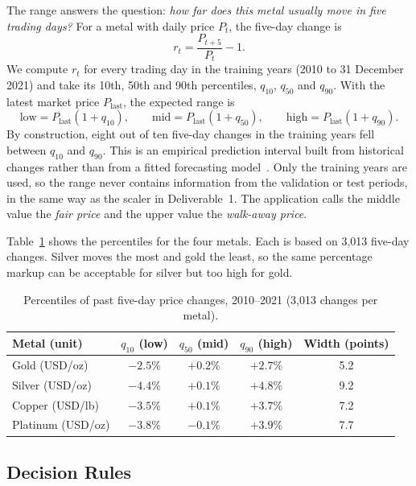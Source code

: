The range answers the question: \emph{how far does this metal usually move in
five trading days?} For a metal with daily price $P_t$, the five-day change is
\[
  r_t = \frac{P_{t+5}}{P_t} - 1 .
\]
We compute $r_t$ for every trading day in the training years (2010 to 31
December 2021) and take its 10th, 50th and 90th percentiles,
$q_{10}$, $q_{50}$ and $q_{90}$. With the latest market price $P_{\text{last}}$,
the expected range is
\[
  \text{low} = P_{\text{last}}(1+q_{10}), \qquad
  \text{mid} = P_{\text{last}}(1+q_{50}), \qquad
  \text{high} = P_{\text{last}}(1+q_{90}).
\]
By construction, eight out of ten five-day changes in the training years fell between $q_{10}$ and $q_{90}$. This is
an empirical prediction interval built from historical changes rather than
from a fitted forecasting model~\cite{a_hyndman2021}. Only the training years
are used, so the range never contains information from the validation or test
periods, in the same way as the scaler in Deliverable~1. The application calls
the middle value the \emph{fair price} and the upper value the
\emph{walk-away price}.

Table~\ref{tab:price-ranges} shows the percentiles for the four metals. Each
is based on 3,013 five-day changes. Silver moves the most and gold the least,
so the same percentage markup can be acceptable for silver but too high for
gold.

\begin{table}[H]
  \centering
  \begin{tabular}{lcccc}
    \toprule
    Metal (unit) & $q_{10}$ (low) & $q_{50}$ (mid) & $q_{90}$ (high) & Width (points) \\
    \midrule
    Gold (USD/oz)     & $-2.5\%$ & $+0.2\%$ & $+2.7\%$ & 5.2 \\
    Silver (USD/oz)   & $-4.4\%$ & $+0.1\%$ & $+4.8\%$ & 9.2 \\
    Copper (USD/lb)   & $-3.5\%$ & $+0.1\%$ & $+3.7\%$ & 7.2 \\
    Platinum (USD/oz) & $-3.8\%$ & $-0.1\%$ & $+3.9\%$ & 7.7 \\
    \bottomrule
  \end{tabular}
  \caption{Percentiles of past five-day price changes, 2010--2021 (3,013 changes per metal).}
  \label{tab:price-ranges}
\end{table}

\subsection{Decision Rules}

